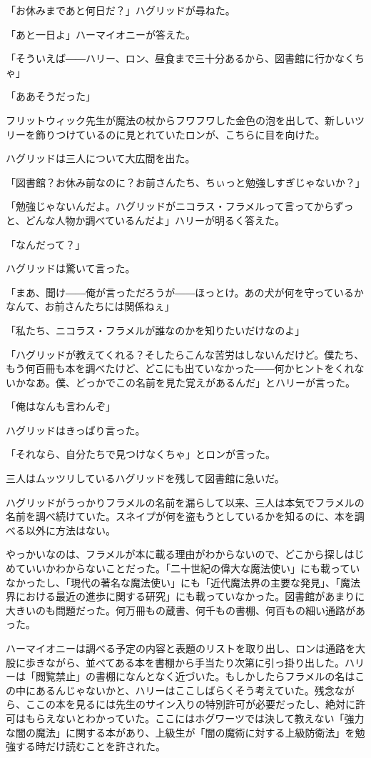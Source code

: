 \documentclass[10pt,a4paper]{article}
\begin{document}
\begin{CJK}{UTF8}{min}
「お休みまであと何日だ？」ハグリッドが尋ねた。

「あと一日よ」ハーマイオニーが答えた。

「そういえば――ハリー、ロン、昼食まで三十分あるから、図書館に行かなくちゃ」

「ああそうだった」

フリットウィック先生が魔法の杖からフワフワした金色の泡を出して、新しいツリーを飾りつけているのに見とれていたロンが、こちらに目を向けた。

ハグリッドは三人について大広間を出た。

「図書館？お休み前なのに？お前さんたち、ちぃっと勉強しすぎじゃないか？」

「勉強じゃないんだよ。ハグリッドがニコラス・フラメルって言ってからずっと、どんな人物か調べているんだよ」ハリーが明るく答えた。

「なんだって？」

ハグリッドは驚いて言った。

「まあ、聞け――俺が言っただろうが――ほっとけ。あの犬が何を守っているかなんて、お前さんたちには関係ねぇ」

「私たち、ニコラス・フラメルが誰なのかを知りたいだけなのよ」

「ハグリッドが教えてくれる？そしたらこんな苦労はしないんだけど。僕たち、もう何百冊も本を調べたけど、どこにも出ていなかった――何かヒントをくれないかなあ。僕、どっかでこの名前を見た覚えがあるんだ」とハリーが言った。

「俺はなんも言わんぞ」

ハグリッドはきっぱり言った。

「それなら、自分たちで見つけなくちゃ」とロンが言った。

三人はムッツリしているハグリッドを残して図書館に急いだ。

ハグリッドがうっかりフラメルの名前を漏らして以来、三人は本気でフラメルの名前を調べ続けていた。スネイプが何を盗もうとしているかを知るのに、本を調べる以外に方法はない。

やっかいなのは、フラメルが本に載る理由がわからないので、どこから探しはじめていいかわからないことだった。「二十世紀の偉大な魔法使い」にも載っていなかったし、「現代の著名な魔法使い」にも「近代魔法界の主要な発見」、「魔法界における最近の進歩に関する研究」にも載っていなかった。図書館があまりに大きいのも問題だった。何万冊もの蔵書、何千もの書棚、何百もの細い通路があった。

ハーマイオニーは調べる予定の内容と表題のリストを取り出し、ロンは通路を大股に歩きながら、並べてある本を書棚から手当たり次第に引っ掛り出した。ハリーは「閲覧禁止」の書棚になんとなく近づいた。もしかしたらフラメルの名はこの中にあるんじゃないかと、ハリーはここしばらくそう考えていた。残念ながら、ここの本を見るには先生のサイン入りの特別許可が必要だったし、絶対に許可はもらえないとわかっていた。ここにはホグワーツでは決して教えない「強力な闇の魔法」に関する本があり、上級生が「闇の魔術に対する上級防衛法」を勉強する時だけ読むことを許された。


\end{CJK}
\end{document}
